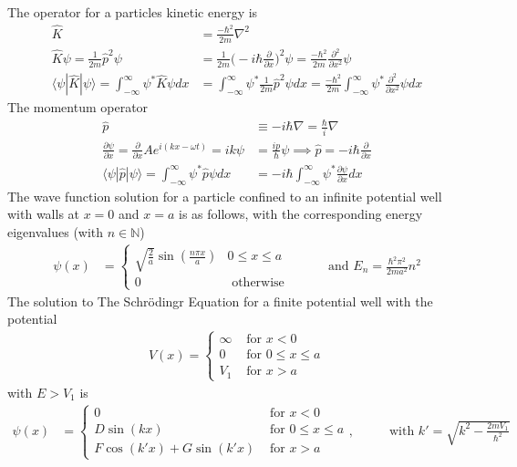 The operator for a particles kinetic energy is
\begin{align}
	\hat{K}&=\frac{-\hbar^2}{2m}\nabla^2 \\
	\hat{K}\psi = \frac{1}{2m}\hat{p}^2\psi &= \frac{1}{2m}\bigg(-i\hbar\frac{\partial}{\partial x}\bigg)^2\psi = \frac{-\hbar^2}{2m}\frac{\partial^2}{\partial x^2}\psi \\
	\langle\psi| \hat{K}|\psi \rangle = \int_{-\infty}^{\infty}\psi^*\hat{K}\psi dx &= \int_{-\infty}^{\infty}\psi^*\frac{1}{2m}\hat{p}^2\psi dx = \frac{-\hbar^2}{2m}\int_{-\infty}^{\infty}\psi^*\frac{\partial^2}{\partial x^2}\psi dx
\end{align}
The momentum operator
\begin{align}
	\hat{p}&\equiv-i\hbar\nabla = \frac{\hbar}{i}\nabla \\
	\frac{\partial \psi}{\partial x}=\frac{\partial}{\partial x}Ae^{i(kx-\omega t)}=ik\psi&=\frac{ip}{\hbar}\psi \implies\hat{p} = -i\hbar \frac{\partial}{\partial x} \\
	\langle\psi| \hat{p}|\psi \rangle = \int_{-\infty}^{\infty} \psi^* \hat{p} \psi dx &= -i\hbar \int_{-\infty}^{\infty} \psi^* \frac{\partial \psi}{\partial x} dx
\end{align}
The wave function solution for a particle confined to an infinite potential well with walls at $x=0$ and $x=a$ is as follows, with the corresponding energy eigenvalues (with $n\in\mathbb{N}$)
\begin{align}
	\psi(x) &=
	\begin{cases}
		\sqrt{\frac{2}{a}}\sin\left(\frac{n\pi x}{a}\right) &  0\leq x \leq a\\
		0 &  \textrm{ otherwise }
	\end{cases} \hspace{1cm}\textrm{ and }
	E_n =\frac{\hbar^2\pi^2}{2ma^2}n^2
\end{align}
The solution to The Schr\"{o}dingr Equation for a finite potential well with the potential
\begin{align}
	V(x)=
	\begin{cases}
		\infty & \textrm{ for } x<0 \\
		0 & \textrm{ for } 0 \leq x \leq a \\
		V_1 & \textrm{ for } x>a
	\end{cases}
\end{align}
with $E>V_1$ is
\begin{align}
	\psi(x) &=
	\begin{cases}
		0 & \textrm{ for } x<0 \\
		D\sin(kx) & \textrm{ for } 0 \leq x \leq a \\
		F\cos(k'x)+G\sin(k'x) & \textrm{ for } x>a
	\end{cases}, \hspace{1cm}\textrm{ with } k'=\sqrt{k^2-\frac{2mV_1}{\hbar^2}}
\end{align}
